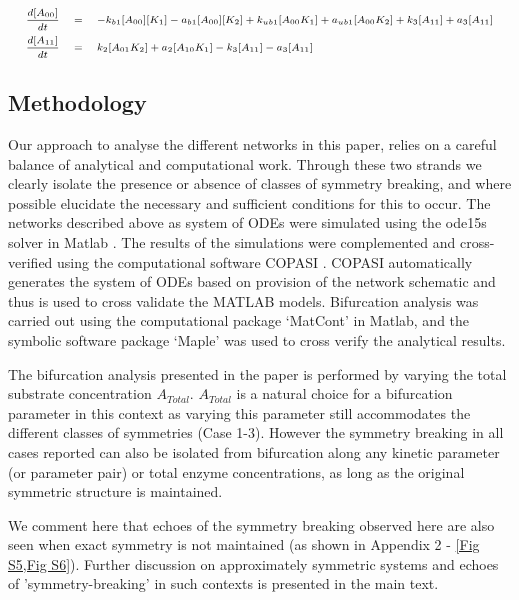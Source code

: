 \documentclass[9pt,lineno]{elife}
\begin{document}
\begin{appendixbox}
\begin{equation}
\scriptsize{    \begin{alignedat}{3}
        & \frac{d[A_{00}]}{dt} \quad &&= \quad -k_{b1}[A_{00}][K_1]-a_{b1}[A_{00}][K_2]+k_{ub1}[A_{00}K_1]+a_{ub1}[A_{00}K_2]+k_3[A_{11}]+a_3[A_{11}] && \\  
        & \frac{d[A_{11}]}{dt} \quad &&= \quad k_{2}[A_{01}K_2]+a_{2}[A_{10}K_1]-k_3[A_{11}]-a_3[A_{11}] && \\  
    \end{alignedat}}
\end{equation}

\subsection*{Methodology}

Our approach to analyse the different networks in this paper, relies on a careful balance of analytical and computational work. Through these two strands we clearly isolate the presence or absence of classes of  symmetry breaking, and where possible elucidate the necessary and sufficient conditions for this to occur. The networks described above as system of ODEs were simulated using the ode15s solver in Matlab \cite{MATLAB}. The results of the simulations were complemented and cross-verified using the computational software COPASI \cite{Hoops2006}. COPASI automatically generates the system of ODEs based on provision of the network schematic and thus is used to cross validate the  MATLAB models. Bifurcation analysis was carried out using the computational package `MatCont' \cite{Dhooge2003a} in Matlab, and the symbolic software package `Maple' \cite{Maple} was used to cross verify the analytical results. 

The bifurcation analysis presented in the paper is performed by varying the total substrate concentration $A_{Total}$. $A_{Total}$ is a natural choice for a bifurcation parameter in this context as varying this parameter still accommodates the different classes of symmetries (Case 1-3). However the symmetry breaking in all cases reported can also be isolated from bifurcation along any kinetic parameter (or parameter pair) or total enzyme concentrations, as long as the original symmetric structure is maintained.

We comment here that echoes of the symmetry breaking observed here are also seen when exact symmetry is not maintained
 (as shown in Appendix 2 - \cref{Fig S5,Fig S6}).
 Further discussion on  approximately symmetric systems and echoes of 'symmetry-breaking' in such contexts is presented in the main text. 


\end{appendixbox}
\end{document}
